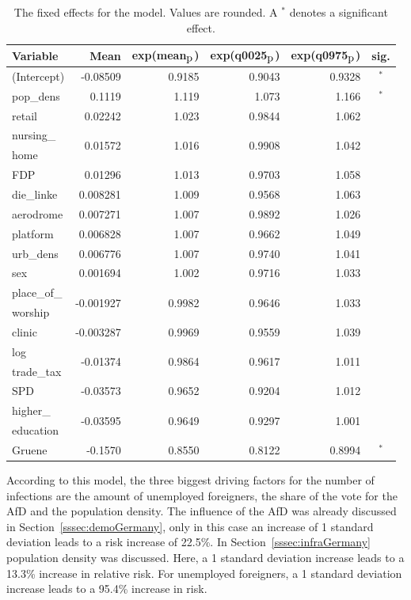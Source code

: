 \begin{table}[H]
\caption{The fixed effects for the model. Values are rounded. A $^*$ denotes a significant effect. \label{FixedAllGermany_spatial}}
\begin{tabular}{l r r r r c}
\toprule
\textbf{Variable}	& \textbf{Mean}	& \textbf{exp(mean$_{\hbox{p}}$)} & \textbf{exp(q0025$_{\hbox{p}}$)} & \textbf{exp(q0975$_{\hbox{p}}$)} & \textbf{sig.}\\
\midrule
(Intercept) & -0.08509 & 0.9185 & 0.9043 & 0.9328 & $^*$\\
pop\_dens & 0.1119 & 1.119 & 1.073 & 1.166 & $^*$\\
retail & 0.02242 & 1.023 & 0.9844 & 1.062 \\
nursing\_ & \multirow{2}{*}{0.01572} & \multirow{2}{*}{1.016} & \multirow{2}{*}{0.9908} & \multirow{2}{*}{1.042} \\
home \\
FDP & 0.01296 & 1.013 & 0.9703 & 1.058 &\\
die\_linke & 0.008281 & 1.009 & 0.9568 & 1.063\\
aerodrome & 0.007271 & 1.007 & 0.9892 & 1.026 \\
platform & 0.006828 & 1.007 & 0.9662 & 1.049 \\
urb\_dens & 0.006776 & 1.007 & 0.9740 & 1.041 \\
sex & 0.001694 & 1.002 & 0.9716 & 1.033 &\\
place\_of\_ & \multirow{2}{*}{-0.001927} & \multirow{2}{*}{0.9982} & \multirow{2}{*}{0.9646} & \multirow{2}{*}{1.033} \\
worship \\
clinic & -0.003287 & 0.9969 & 0.9559 & 1.039 \\
log & \multirow{2}{*}{-0.01374} & \multirow{2}{*}{0.9864} & \multirow{2}{*}{0.9617} & \multirow{2}{*}{1.011}\\
trade\_tax \\
SPD & -0.03573 & 0.9652 & 0.9204 & 1.012 \\
higher\_ & \multirow{2}{*}{-0.03595} & \multirow{2}{*}{0.9649} & \multirow{2}{*}{0.9297} & \multirow{2}{*}{1.001} \\
education \\
Gruene & -0.1570 & 0.8550 & 0.8122 & 0.8994 & $^*$\\
\bottomrule
\end{tabular}
\end{table}
According to this model, the three biggest driving factors for the number of infections are the amount of unemployed foreigners, the share of the vote for the AfD and the population density. The influence of the AfD was already discussed in Section~\ref{sssec:demoGermany}, only in this case an increase of 1 standard deviation leads to a risk increase of 22.5\%. In Section~\ref{sssec:infraGermany} population density was discussed. Here, a 1 standard deviation increase leads to a 13.3\% increase in relative risk. For unemployed foreigners, a 1 standard deviation increase leads to a 95.4\% increase in risk. \\
